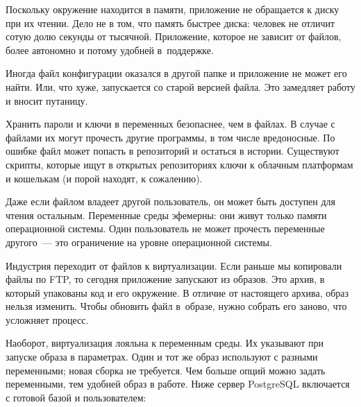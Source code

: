 Поскольку окружение находится в памяти, приложение не обращается к диску при их
чтении. Дело не в том, что память быстрее диска: человек не отличит сотую долю
секунды от тысячной. Приложение, которое не зависит от файлов, более автономно и
потому удобней в~поддержке.

Иногда файл конфигурации оказался в другой папке и приложение не может его
найти. Или, что хуже, запускается со старой версией файла. Это замедляет работу
и вносит путаницу.

\label{password-note}


Хранить пароли и ключи в переменных безопаснее, чем в файлах. В случае с файлами
их могут прочесть другие программы, в том числе вредоносные. По ошибке файл
может попасть в репозиторий и остаться в истории. Существуют скрипты, которые
ищут в открытых репозиториях ключи к облачным платформам и кошелькам (и порой
находят, к сожалению).

Даже если файлом владеет другой пользователь, он может быть доступен для чтения
остальным. Переменные среды эфемерны: они живут только памяти операционной
системы. Один пользователь не может прочесть переменные другого~--- это
ограничение на уровне операционной системы.


Индустрия переходит от файлов к виртуализации. Если раньше мы копировали файлы
по FTP, то сегодня приложение запускают из образов. Это архив, в который
упакованы код и его окружение. В отличие от настоящего архива, образ нельзя
изменить. Чтобы обновить файл в~образе, нужно собрать его заново, что усложняет
процесс.


Наоборот, виртуализация лояльна к переменным среды. Их указывают при запуске
образа в параметрах. Один и тот же образ используют с разными переменными; новая
сборка не требуется. Чем больше опций можно задать переменными, тем удобней
образ в работе. Ниже сервер PostgreSQL включается с готовой базой и
пользователем:

\begin{english}
\end{english}


